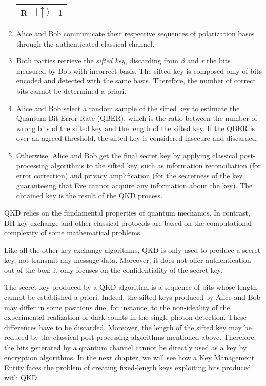 \begin{enumerate}
\begin{table}[H]
\begin{tabular}{| c | c | c |}
        R & $|\uparrow\rangle$ & 1\\\hline
        \end{tabular}
    \end{table}
    \item Alice and Bob communicate their respective sequences of polarization bases through the authenticated classical channel.
    \item Both parties retrieve the \textit{sifted key}, discarding from $\beta$ and \textit{r} the bits measured by Bob with incorrect basis. The sifted key is composed only of bits encoded and detected with the same basis. Therefore, the number of correct bits cannot be determined a priori.
    \item Alice and Bob select a random sample of the sifted key to estimate the Quantum Bit Error Rate (QBER), which is the ratio between the number of wrong bits of the sifted key and the length of the sifted key. If the QBER is over an agreed threshold, the sifted key is considered insecure and discarded.
    \item Otherwise, Alice and Bob get the final secret key by applying classical post-processing algorithms to the sifted key, such as information reconciliation (for error correction) and privacy amplification \cite{privacyamp} (for the secretness of the key, guaranteeing that Eve cannot acquire any information about the key). The obtained key is the result of the QKD process.
\end{enumerate}

QKD relies on the fundamental properties of quantum mechanics. In contrast, DH key exchange and other classical protocols are based on the computational complexity of some mathematical problems.

Like all the other key exchange algorithms, QKD is only used to produce a secret key, not transmit any message data. Moreover, it does not offer authentication out of the box: it only focuses on the confidentiality of the secret key.

\label{ch1:length}
The secret key produced by a QKD algorithm is a sequence of bits whose length cannot be established a priori. Indeed, the sifted keys produced by Alice and Bob may differ in some positions due, for instance, to the non-ideality of the experimental realization or dark counts in the single-photon detection. These differences have to be discarded. Moreover, the length of the sifted key may be reduced by the classical post-processing algorithms mentioned above. Therefore, the bits generated by a quantum channel cannot be directly used as a key by encryption algorithms. In the next chapter, we will see how a Key Management Entity faces the problem of creating fixed-length keys exploiting bits produced with QKD.

